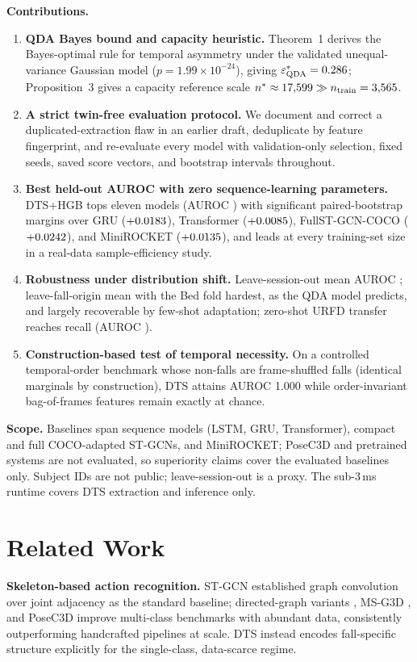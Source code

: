 \documentclass[letterpaper]{article}
\begin{document}
\noindent\textbf{Contributions.}
\begin{enumerate}
\item \textbf{QDA Bayes bound and capacity heuristic.} Theorem~1 derives the Bayes-optimal rule for temporal asymmetry under the validated unequal-variance Gaussian model ($p = 1.99{\times}10^{-24}$), giving $\varepsilon^*_{\mathrm{QDA}} = 0.286$; Proposition~3 gives a capacity reference scale $n^* \approx 17{,}599 \gg n_{\mathrm{train}} = 3{,}565$.
\item \textbf{A strict twin-free evaluation protocol.} We document and correct a duplicated-extraction flaw in an earlier draft, deduplicate by feature fingerprint, and re-evaluate every model with validation-only selection, fixed seeds, saved score vectors, and bootstrap intervals throughout.
\item \textbf{Best held-out AUROC with zero sequence-learning parameters.} DTS+HGB tops eleven models (AUROC \DTSHGBauroc{} \DTSHGBaurocCI) with significant paired-bootstrap margins over GRU ($+0.0183$), Transformer ($+0.0085$), FullST-GCN-COCO ($+0.0242$), and MiniROCKET ($+0.0135$), and leads at every training-set size in a real-data sample-efficiency study.
\item \textbf{Robustness under distribution shift.} Leave-session-out mean AUROC \lsomeanauroc; leave-fall-origin mean \lfomeanauroc{} with the Bed fold hardest, as the QDA model predicts, and largely recoverable by few-shot adaptation; zero-shot URFD transfer reaches recall \urfdrec{} (AUROC \urfdauroc).
\item \textbf{Construction-based test of temporal necessity.} On a controlled temporal-order benchmark whose non-falls are frame-shuffled falls (identical marginals by construction), DTS attains AUROC 1.000 while order-invariant bag-of-frames features remain exactly at chance.
\end{enumerate}

\noindent\textbf{Scope.} Baselines span sequence models (LSTM, GRU, Transformer), compact and full COCO-adapted ST-GCNs, and MiniROCKET; PoseC3D \citep{duan2022} and pretrained systems are not evaluated, so superiority claims cover the evaluated baselines only. Subject IDs are not public; leave-session-out is a proxy. The sub-3\,ms runtime covers DTS extraction and inference only.

\section{Related Work}
\textbf{Skeleton-based action recognition.} ST-GCN \citep{yan2018} established graph convolution over joint adjacency as the standard baseline; directed-graph variants \citep{shi2019}, MS-G3D \citep{liu2020}, and PoseC3D \citep{duan2022} improve multi-class benchmarks with abundant data, consistently outperforming handcrafted pipelines at scale. DTS instead encodes fall-specific structure explicitly for the single-class, data-scarce regime.
\end{document}
